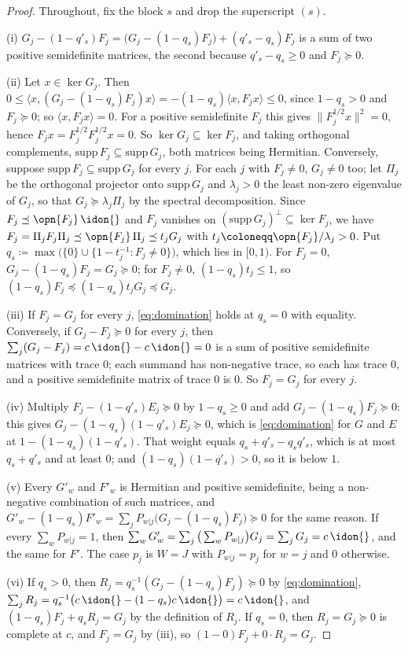 \begin{proof}
Throughout, fix the block $s$ and drop the superscript $(s)$.

(i) $G_j-(1-q'_s)F_j=\big(G_j-(1-q_s)F_j\big)+(q'_s-q_s)F_j$ is a sum of two
positive semidefinite matrices, the second because $q'_s-q_s\ge0$ and
$F_j\succeq0$.

(ii) Let $x\in\ker G_j$. Then
$0\le\langle x,(G_j-(1-q_s)F_j)x\rangle=-(1-q_s)\langle x,F_jx\rangle\le0$,
since $1-q_s>0$ and $F_j\succeq0$; so $\langle x,F_jx\rangle=0$. For a
positive semidefinite $F_j$ this gives $\|F_j^{1/2}x\|^2=0$, hence
$F_jx=F_j^{1/2}F_j^{1/2}x=0$. So $\ker G_j\subseteq\ker F_j$, and taking
orthogonal complements, $\mathrm{supp}\,F_j\subseteq\mathrm{supp}\,G_j$, both
matrices being Hermitian.
Conversely, suppose $\mathrm{supp}\,F_j\subseteq\mathrm{supp}\,G_j$ for every
$j$. For each $j$ with $F_j\neq0$, $G_j\neq0$ too; let $\Pi_j$ be the
orthogonal projector onto $\mathrm{supp}\,G_j$ and $\lambda_j>0$ the least
non-zero eigenvalue of $G_j$, so that $G_j\succeq\lambda_j\Pi_j$ by the
spectral decomposition. Since $F_j\preceq\opn{F_j}\,\idon{}$ and $F_j$ vanishes
on $(\mathrm{supp}\,G_j)^{\perp}\subseteq\ker F_j$, we have
$F_j=\Pi_jF_j\Pi_j\preceq\opn{F_j}\,\Pi_j\preceq t_jG_j$ with
$t_j\coloneqq\opn{F_j}/\lambda_j>0$. Put
$q_s\coloneqq\max\big(\{0\}\cup\{1-t_j^{-1}:F_j\neq0\}\big)$, which lies in
$[0,1)$. For $F_j=0$, $G_j-(1-q_s)F_j=G_j\succeq0$; for $F_j\neq0$,
$(1-q_s)t_j\le1$, so $(1-q_s)F_j\preceq(1-q_s)t_jG_j\preceq G_j$.

(iii) If $F_j=G_j$ for every $j$, \eqref{eq:domination} holds at $q_s=0$ with
equality. Conversely, if $G_j-F_j\succeq0$ for every $j$, then
$\sum_j(G_j-F_j)=c\,\idon{}-c\,\idon{}=0$ is a sum of positive semidefinite
matrices with trace $0$; each summand has non-negative trace, so each has
trace $0$, and a positive semidefinite matrix of trace $0$ is $0$. So
$F_j=G_j$ for every $j$.

(iv) Multiply $F_j-(1-q'_s)E_j\succeq0$ by $1-q_s\ge0$ and add
$G_j-(1-q_s)F_j\succeq0$: this gives $G_j-(1-q_s)(1-q'_s)E_j\succeq0$, which
is \eqref{eq:domination} for $G$ and $E$ at $1-(1-q_s)(1-q'_s)$. That weight
equals $q_s+q'_s-q_sq'_s$, which is at most $q_s+q'_s$ and at least $0$;
and $(1-q_s)(1-q'_s)>0$, so it is below $1$.

(v) Every $G'_w$ and $F'_w$ is Hermitian and positive semidefinite, being a
non-negative combination of such matrices, and
$G'_w-(1-q_s)F'_w=\sum_jP_{w|j}\big(G_j-(1-q_s)F_j\big)\succeq0$ for the same
reason. If every $\sum_wP_{w|j}=1$, then
$\sum_wG'_w=\sum_j\big(\sum_wP_{w|j}\big)G_j=\sum_jG_j=c\,\idon{}$, and the
same for $F'$. The case $p_j$ is $W=J$ with $P_{w|j}=p_j$ for $w=j$ and $0$
otherwise.

(vi) If $q_s>0$, then
$R_j=q_s^{-1}(G_j-(1-q_s)F_j)\succeq0$ by \eqref{eq:domination},
$\sum_jR_j=q_s^{-1}\big(c\,\idon{}-(1-q_s)c\,\idon{}\big)=c\,\idon{}$, and
$(1-q_s)F_j+q_sR_j=G_j$ by the definition of $R_j$. If $q_s=0$, then
$R_j=G_j\succeq0$ is complete at $c$, and $F_j=G_j$ by (iii), so
$(1-0)F_j+0\cdot R_j=G_j$.
\end{proof}
